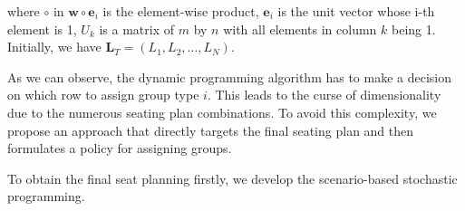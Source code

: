 where $\circ$ in $\mathbf{w} \circ \mathbf{e}_{i}$ is the element-wise product, $\mathbf{e}_{i}$ is the unit vector whose i-th element is 1, $U_k$ is a matrix of $m$ by $n$ with all elements in column $k$ being 1.  Initially, we have $\mathbf{L}_{T} = (L_1, L_2, \ldots, L_{N})$. 


As we can observe, the dynamic programming algorithm has to make a decision on which row to assign group type $i$. This leads to the curse of dimensionality due to the numerous seating plan combinations. To avoid this complexity, we propose an approach that directly targets the final seating plan and then formulates a policy for assigning groups.

To obtain the final seat planning firstly, we develop the scenario-based stochastic programming.








